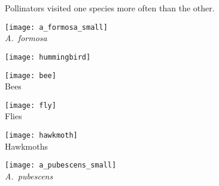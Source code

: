 \documentclass[t,hidelinks]{beamer}
\begin{document}
\begin{frame}[t]{Pollinators visited one species more often than the other.}

	\vspace*{-1\baselineskip}
	
	\begin{multicols}{3}
		
		\vspace*{3\baselineskip}
		
		\texttt{[image: a\_formosa\_small]}\\
		\textit{A.~formosa}
				
	\columnbreak
	
		\begin{center}
			
		\texttt{[image: hummingbird]}\\
		\vspace*{-0.5ex}{\footnotesize Hummingbirds}
		
		\bigskip

		\texttt{[image: bee]}\\
		{\footnotesize Bees}
		
		\bigskip
		
		\texttt{[image: fly]}\\
		{\footnotesize Flies}
		
		\bigskip
	
		\texttt{[image: hawkmoth]}\\
		{\footnotesize Hawkmoths}
		
		\end{center}
	\columnbreak
	
		\vspace*{3\baselineskip}

		\hfill \texttt{[image: a\_pubescens\_small]}\\
		\hfill \textit{A.~pubescens}
		
\end{multicols}
\end{frame}
\end{document}
